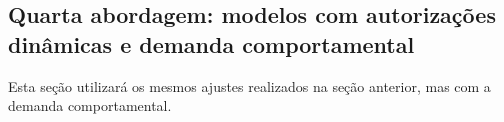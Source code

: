 

\subsection{Quarta abordagem: modelos com autorizações dinâmicas e demanda comportamental}

Esta seção utilizará os mesmos ajustes realizados na seção anterior, mas com a demanda comportamental.


